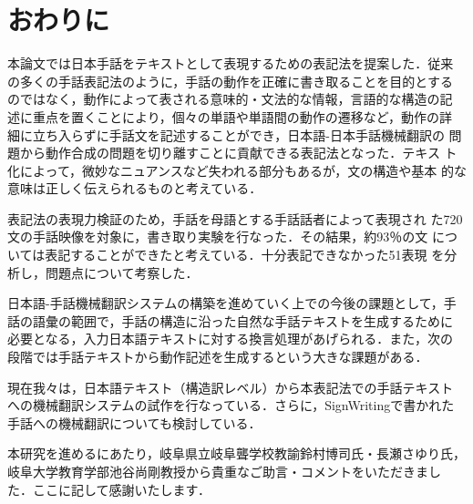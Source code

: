 \section{おわりに}

本論文では日本手話をテキストとして表現するための表記法を提案した．従来
の多くの手話表記法のように，手話の動作を正確に書き取ることを目的とする
のではなく，動作によって表される意味的・文法的な情報，言語的な構造の記
述に重点を置くことにより，個々の単語や単語間の動作の遷移など，動作の詳
細に立ち入らずに手話文を記述することができ，日本語-日本手話機械翻訳の
問題から動作合成の問題を切り離すことに貢献できる表記法となった．テキス
ト化によって，微妙なニュアンスなど失われる部分もあるが，文の構造や基本
的な意味は正しく伝えられるものと考えている．

表記法の表現力検証のため，手話を母語とする手話話者によって表現され
た720文の手話映像を対象に，書き取り実験を行なった．その結果，約93％の文
については表記することができたと考えている．十分表記できなかった51表現
を分析し，問題点について考察した．

日本語-手話機械翻訳システムの構築を進めていく上での今後の課題として，手
話の語彙の範囲で，手話の構造に沿った自然な手話テキストを生成するために
必要となる，入力日本語テキストに対する換言処理があげられる．また，次の
段階では手話テキストから動作記述を生成するという大きな課題がある．

現在我々は，日本語テキスト（構造訳レベル）から本表記法での手話テキスト
への機械翻訳システムの試作を行なっている．さらに，SignWritingで書かれた
手話への機械翻訳についても検討している．


\acknowledgment

本研究を進めるにあたり，岐阜県立岐阜聾学校教諭鈴村博司氏・長瀬さゆり氏，
岐阜大学教育学部池谷尚剛教授から貴重なご助言・コメントをいただきまし
た．ここに記して感謝いたします．


